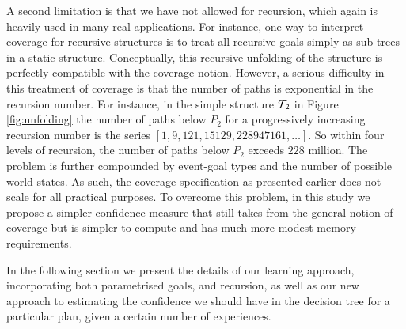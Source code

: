 A second limitation is that we
have not allowed for recursion, which again is heavily used in many
real applications. 
For instance, one way to interpret coverage for recursive structures is to treat all recursive goals simply as sub-trees in a static structure. Conceptually, this recursive unfolding of the structure is perfectly compatible with the coverage notion. 
However, a serious difficulty in this treatment of coverage is that the number of paths is exponential in the recursion number. For instance, in the simple structure ${\mathcal{T}}_2$ in Figure \ref{fig:unfolding} the number of paths below $P_2$ for a progressively increasing recursion number is the series $[1, 9, 121, 15129, 228947161, \ldots]$. So within four levels of recursion, the number of paths below $P_2$ exceeds $228$ million. The problem is further compounded by event-goal types and the number of possible world states. As such, the coverage specification as presented earlier does not scale for all practical purposes. To overcome this problem, in this study we propose a simpler confidence measure that still takes from the general notion of coverage but is simpler to compute and has much more modest memory requirements.


In the following section we present the details of our learning
approach, incorporating both parametrised goals, and recursion, as
well as our new approach to estimating the confidence we should have in
the decision tree for a particular plan, given a certain number of
experiences. 










